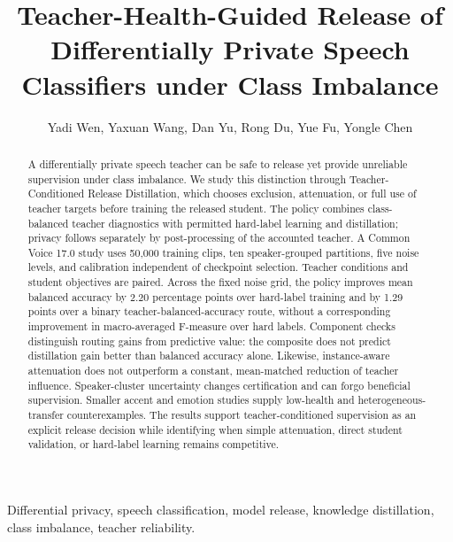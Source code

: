 \documentclass[journal]{IEEEtran}
\theoremstyle{definition}
\theoremstyle{plain}
\begin{document}
\title{Teacher-Health-Guided Release of Differentially Private Speech Classifiers under Class Imbalance}
\author{Yadi Wen, Yaxuan Wang, Dan Yu, Rong Du, Yue Fu, Yongle Chen\\
}
\maketitle
\thispagestyle{plain}

\begin{abstract}
A differentially private speech teacher can be safe to release yet provide unreliable supervision under class imbalance. We study this distinction through Teacher-Conditioned Release Distillation, which chooses exclusion, attenuation, or full use of teacher targets before training the released student. The policy combines class-balanced teacher diagnostics with permitted hard-label learning and distillation; privacy follows separately by post-processing of the accounted teacher. A Common Voice 17.0 study uses 50,000 training clips, ten speaker-grouped partitions, five noise levels, and calibration independent of checkpoint selection. Teacher conditions and student objectives are paired. Across the fixed noise grid, the policy improves mean balanced accuracy by 2.20 percentage points over hard-label training and by 1.29 points over a binary teacher-balanced-accuracy route, without a corresponding improvement in macro-averaged F-measure over hard labels. Component checks distinguish routing gains from predictive value: the composite does not predict distillation gain better than balanced accuracy alone. Likewise, instance-aware attenuation does not outperform a constant, mean-matched reduction of teacher influence. Speaker-cluster uncertainty changes certification and can forgo beneficial supervision. Smaller accent and emotion studies supply low-health and heterogeneous-transfer counterexamples. The results support teacher-conditioned supervision as an explicit release decision while identifying when simple attenuation, direct student validation, or hard-label learning remains competitive.
\end{abstract}
\begin{IEEEkeywords}
Differential privacy, speech classification, model release, knowledge distillation, class imbalance, teacher reliability.
\end{IEEEkeywords}
\IEEEpeerreviewmaketitle
\end{document}
